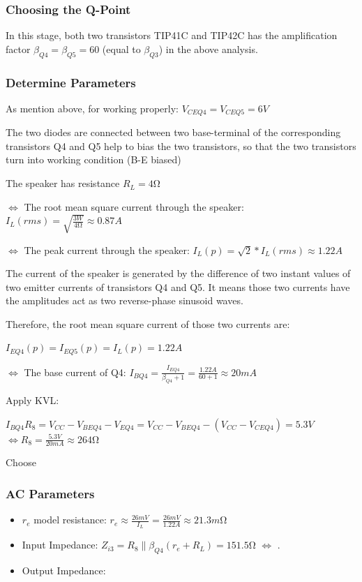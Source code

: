 \documentclass[twoside, a4paper, leqno]{article}
\begin{document}
	\subsubsection*{Choosing the Q-Point}
	In this stage, both two transistors TIP41C and TIP42C has the amplification factor $\beta_{Q4} = \beta_{Q5} = 60$ (equal to $\beta_{Q3}$) in the above analysis.
	\subsubsection*{Determine Parameters}
		As mention above, for working properly: $V_{CEQ4} = V_{CEQ5} = 6V$
		
		The two diodes are connected between two base-terminal of the corresponding transistors Q4 and Q5 help to bias the two transistors, so that the two transistors turn into working condition (B-E biased)
		
		The speaker has resistance $R_L = 4\si{\ohm}$
		
		$\Leftrightarrow$ The root mean square current through the speaker: $I_L(rms) = \sqrt{\frac{3W}{4\si{\ohm}}} \approx 0.87A$
		
			$\Leftrightarrow$ The peak current through the speaker: $I_L(p) = \sqrt{2}*I_L(rms) \approx 1.22A$
		
		The current of the speaker is generated by the difference of two instant values of two emitter currents of transistors Q4 and Q5. It means those two currents have the amplitudes act as two reverse-phase sinusoid waves. 
		
		Therefore, the root mean square current of those two currents are:
		
		$I_{EQ4}(p) = I_{EQ5}(p) = I_L(p) = 1.22A$	
		
		$\Leftrightarrow$ The base current of Q4: $I_{BQ4} = \frac{I_{EQ4}}{\beta_{Q4}+1} = \frac{1.22A}{60+1} \approx 20mA$
			
		Apply KVL:
		
		$I_{BQ4}R_8 = V_{CC} - V_{BEQ4} - V_{EQ4} =V_{CC} - V_{BEQ4} - (V_{CC} - V_{CEQ4}) = 5.3V$
		$\Leftrightarrow R_8 = \frac{5.3V}{20mA} \approx 264\si{\ohm}$ 
		
		Choose 
		
		\subsubsection*{AC Parameters}
		
		\begin{itemize}
			\item $r_e$ model resistance: $r_e \approx \frac{26mV}{I_L} = \frac{26mV}{1.22A} \approx 21.3m\si{\ohm}$
			
			\item Input Impedance: $Z_{i3} = R_8 \parallel \beta_{Q4}(r_e + R_L) = 151.5 \si{\ohm}$ $\Leftrightarrow$ .
			
			\item Output Impedance: 
			
		\end{itemize}
	
\end{document}
